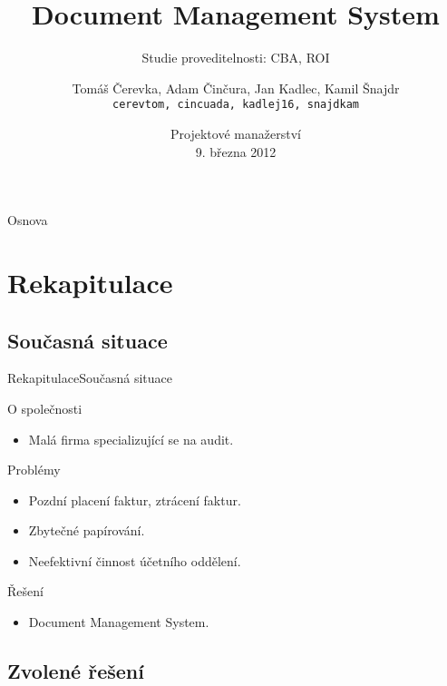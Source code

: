 \documentclass[10pt]{beamer}
\title[Document Management System]{Document Management System}
\subtitle{Studie proveditelnosti: CBA, ROI}
\author[Kamil Šnajdr] {
  Tomáš Čerevka, Adam Činčura, Jan Kadlec, Kamil Šnajdr \\
  {\tt cerevtom, cincuada, kadlej16, snajdkam}
}
\institute[ČVUT FIT] {
  Fakulta informačních technologií \\
  České vysoké učení technické \\
  Praha
}
\date[\today]{
Projektové manažerství \\
{\normalsize 9. března 2012}
}
\begin{document}
\begin{frame}[plain]
  \titlepage
\end{frame}

\begin{frame}{Osnova}
	\tableofcontents
\end{frame}

\section{Rekapitulace}

\subsection{Současná situace}

\begin{frame}{Rekapitulace}{Současná situace}	
		
  \begin{block}{O společnosti}
    \begin{itemize}
			\item Malá firma specializující se na audit.
		\end{itemize}
	\end{block}
			
	\begin{block}{Problémy}
		\begin{itemize}
			\item Pozdní placení faktur, ztrácení faktur.
			\item Zbytečné papírování.
			\item Neefektivní činnost účetního oddělení.
		\end{itemize}
	\end{block}
	
		\begin{block}{Řešení}
		\begin{itemize}
			\item Document Management System.
		\end{itemize}
	\end{block}
\end{frame}

\subsection{Zvolené řešení}
\end{document}
